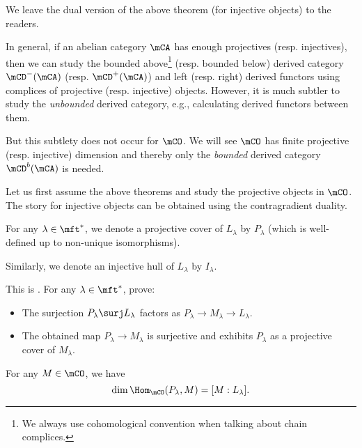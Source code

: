 	\begin{rem}
		We leave the dual version of the above theorem (for injective objects) to the readers.
	\end{rem}

	\begin{rem}
		In general, if an abelian category $\mCA$ has enough projectives (resp. injectives), then we can study the bounded above\footnote{We always use cohomological convention when talking about chain complices.} (resp. bounded below) derived category $\mCD^-(\mCA)$ (resp. $\mCD^+(\mCA)$) and left (resp. right) derived functors using complices of projective (resp. injective) objects. However, it is much subtler to study the \emph{unbounded} derived category, e.g., calculating derived functors between them.

		But this subtlety does not occur for $\mCO$. We will see $\mCO$ has finite projective (resp. injective) dimension and thereby only the \emph{bounded} derived category $\mCD^b(\mCA)$ is needed.

	\end{rem}

	Let us first assume the above theorems and study the projective objects in $\mCO$. The story for injective objects can be obtained using the contragradient duality.

	\begin{notn}
		For any $\lambda\in \mft^*$, we denote a projective cover of $L_\lambda$ by $P_\lambda$ (which is well-defined up to non-unique isomorphisms).

		Similarly, we denote an injective hull of $L_\lambda$ by $I_\lambda$.
	\end{notn}


	\begin{exe}
		This is . For any $\lambda\in \mft^*$, prove:
		\begin{itemize}
			\item[(1)] 
				The surjection $P_\lambda \surj L_\lambda$ factors as $P_\lambda\to M_\lambda \to L_\lambda$.
			\item[(2)]
				The obtained map $P_\lambda \to M_\lambda$ is surjective and exhibits $P_\lambda$ as a projective cover of $M_\lambda$.
		\end{itemize}
	\end{exe}

	\begin{cor}
		\label{cor-BGG-pre}
		For any $M\in \mCO$, we have
		\[
			\dim \Hom_\mCO(P_\lambda,M) = [M:L_\lambda].
		\]
	\end{cor}

